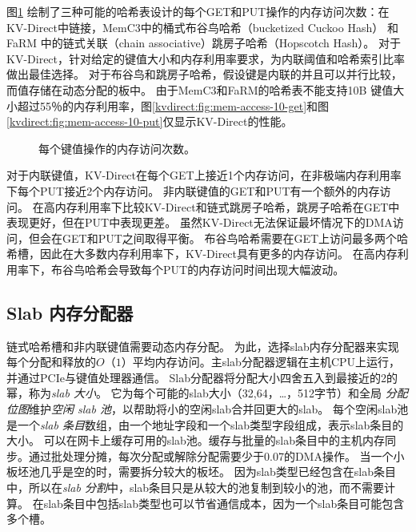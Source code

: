 图\ref {kvdirect:fig:mem-access-tput} 绘制了三种可能的哈希表设计的每个GET和PUT操作的内存访问次数：在KV-Direct中链接，MemC3中的桶式布谷鸟哈希（bucketized Cuckoo Hash）\cite {fan2013memc3} 和FaRM \cite {dragojevic2014farm} 中的链式关联（chain associative）跳房子哈希（Hopscotch Hash）。
对于KV-Direct，针对给定的键值大小和内存利用率要求，为内联阈值和哈希索引比率做出最佳选择。
对于布谷鸟和跳房子哈希，假设键是内联的并且可以并行比较，而值存储在动态分配的板中。
由于MemC3和FaRM的哈希表不能支持10B 键值大小超过55％的内存利用率，图\ref {kvdirect:fig:mem-access-10-get}和图\ref {kvdirect:fig:mem-access-10-put}仅显示KV-Direct的性能。


\begin{figure}[htbp]
	\centering
	
	\vfill
	
	\caption{每个键值操作的内存访问次数。}
	\label{kvdirect:fig:mem-access-tput}
\end{figure}


对于内联键值，KV-Direct在每个GET上接近1个内存访问，在非极端内存利用率下每个PUT接近2个内存访问。
非内联键值的GET和PUT有一个额外的内存访问。
在高内存利用率下比较KV-Direct和链式跳房子哈希，跳房子哈希在GET中表现更好，但在PUT中表现更差。
虽然KV-Direct无法保证最坏情况下的DMA访问，但会在GET和PUT之间取得平衡。
布谷鸟哈希需要在GET上访问最多两个哈希槽，因此在大多数内存利用率下，KV-Direct具有更多的内存访问。
在高内存利用率下，布谷鸟哈希会导致每个PUT的内存访问时间出现大幅波动。



\subsection{Slab 内存分配器}
\label{kvdirect:sec:slab}

链式哈希槽和非内联键值需要动态内存分配。
为此，选择slab内存分配器\cite {bonwick1994slab}来实现每个分配和释放的$O（1）$平均内存访问。主slab分配器逻辑在主机CPU上运行，并通过PCIe与键值处理器通信。
Slab分配器将分配大小四舍五入到最接近的2的幂，称为\textit {slab 大小}。
它为每个可能的slab大小（32,64，\ldots，512字节）和全局 \textit {分配位图}维护\textit {空闲 slab 池}，以帮助将小的空闲slab合并回更大的slab。
每个空闲slab池是一个\textit {slab 条目}数组，由一个地址字段和一个slab类型字段组成，表示slab条目的大小。
可以在网卡上缓存可用的slab池。缓存与批量的slab条目中的主机内存同步。通过批处理分摊，每次分配或解除分配需要少于0.07的DMA操作。
当一个小板坯池几乎是空的时，需要拆分较大的板坯。
因为slab类型已经包含在slab条目中，所以在\textit {slab 分割}中，slab条目只是从较大的池复制到较小的池，而不需要计算。
在slab条目中包括slab类型也可以节省通信成本，因为一个slab条目可能包含多个槽。

